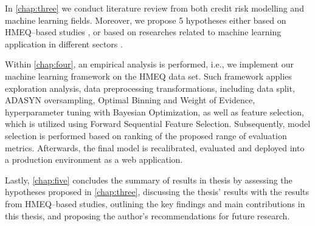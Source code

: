 In \autoref{chap:three} we conduct literature review from both credit risk modelling and machine learning fields. Moreover, we propose 5 hypotheses either based on HMEQ--based studies \citep{serkan2021bagging, zurada2014classification}, or based on researches related to machine learning application in different sectors \citep{de2023predicting, pintelas2020grey, wu2018accurate}.

Within \autoref{chap:four}, an empirical analysis is performed, i.e., we implement our machine learning framework on the HMEQ data set.
Such framework applies exploration analysis, data preprocessing transformations, including data split, ADASYN oversampling, Optimal Binning and Weight of Evidence, hyperparameter tuning with Bayesian Optimization, as well as feature selection, which is utilized using Forward Sequential Feature Selection.
Subsequently, model selection is performed based on ranking of the proposed range of evaluation metrics.
Afterwards, the final model is recalibrated, evaluated and deployed into a production environment as a web application.

Lastly, \autoref{chap:five} concludes the summary of results in thesis by assessing the hypotheses proposed in \autoref{chap:three}, discussing the thesis' results  with the results from HMEQ--based studies, outlining the key findings and main contributions in this thesis, and proposing the author's recommendations for future research. 
